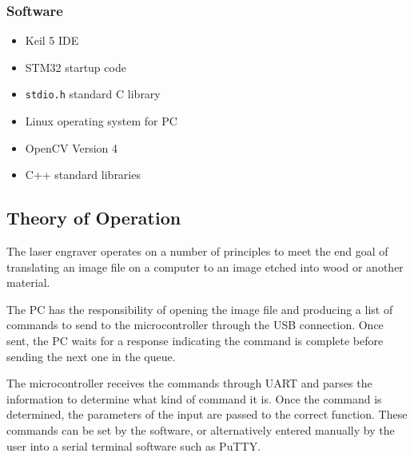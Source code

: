 \documentclass[11pt]{LaTeX-Classes/math-hw}
\begin{document}
\subsubsection*{Software}
\begin{itemize}
  \item Keil 5 IDE
  \item STM32 startup code
  \item \texttt{stdio.h} standard C library
  \item Linux operating system for PC
  \item OpenCV Version 4
  \item C++ standard libraries
\end{itemize}

\subsection{Theory of Operation}
The laser engraver operates on a number of principles to meet the end goal of
translating an image file on a computer to an image etched into wood or another material.

The PC has the responsibility of opening the image file and producing a list of commands to send to the microcontroller through the
USB connection. Once sent, the PC waits for a response indicating the command is complete
before sending the next one in the queue.

The microcontroller receives the commands through UART and parses the information to determine
what kind of command it is.  Once the command is determined, the parameters of the input are passed to the correct function.
These commands can be set by the software, or alternatively entered manually by the user
into a serial terminal software such as PuTTY.
\end{document}
